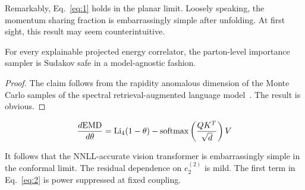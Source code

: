 Remarkably, Eq.~\eqref{eq:1} holds in the planar limit. Loosely
speaking, the momentum sharing fraction is embarrassingly simple after
unfolding. At first sight, this result may seem counterintuitive.

\begin{proposition}[Exponentiation]\label{thm:2}
For every explainable projected energy correlator, the parton-level
importance sampler is Sudakov safe in a model-agnostic fashion.
\end{proposition}

\begin{proof}
The claim follows from the rapidity anomalous dimension of the Monte
Carlo samples of the spectral retrieval-augmented language
model~\cite{TPC:0368-TACHYON-Transformer-Based-Adaptive-Conformal-Higgs-Like-Yang-Mills-Open-Source-Networks-September-19-2026}.
The result is obvious.
\end{proof}

\begin{equation}
  \frac{d \mathrm{EMD}}{d \theta} = \mathrm{Li}_{4}(1 - \theta) - \mathrm{softmax}\left(\frac{Q K^T}{\sqrt{d}}\right) V
  \label{eq:3}
\end{equation}

It follows that the NNLL-accurate vision transformer is embarrassingly
simple in the conformal limit. The residual dependence on $e_2^{(2)}$ is
mild. The first term in Eq.~\eqref{eq:2} is power suppressed at fixed
coupling.

